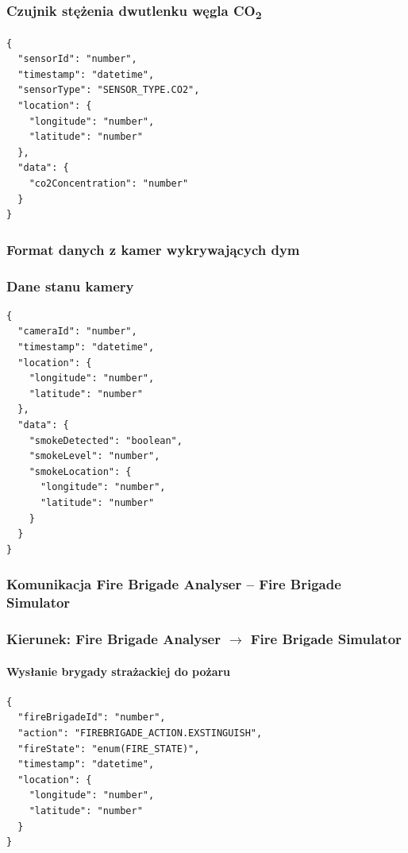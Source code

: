 \subsubsection*{Czujnik stężenia dwutlenku węgla CO\textsubscript{2}}

\begin{verbatim}
{
  "sensorId": "number",
  "timestamp": "datetime",
  "sensorType": "SENSOR_TYPE.CO2",
  "location": {
    "longitude": "number",
    "latitude": "number"
  },
  "data": {
    "co2Concentration": "number"
  }
}
\end{verbatim}

\subsubsection{Format danych z kamer wykrywających dym}

\subsubsection*{Dane stanu kamery}

\begin{verbatim}
{
  "cameraId": "number",
  "timestamp": "datetime",
  "location": {
    "longitude": "number",
    "latitude": "number"
  },
  "data": {
    "smokeDetected": "boolean",
    "smokeLevel": "number",
    "smokeLocation": {
      "longitude": "number",
      "latitude": "number"
    }
  }
}
\end{verbatim}

\subsubsection{Komunikacja Fire Brigade Analyser -- Fire Brigade Simulator}

\subsubsection*{Kierunek: Fire Brigade Analyser $\rightarrow$ Fire Brigade Simulator}

\paragraph{Wysłanie brygady strażackiej do pożaru}

\begin{verbatim}
{
  "fireBrigadeId": "number",
  "action": "FIREBRIGADE_ACTION.EXSTINGUISH",
  "fireState": "enum(FIRE_STATE)",
  "timestamp": "datetime",
  "location": {
    "longitude": "number",
    "latitude": "number"
  }
}
\end{verbatim}

